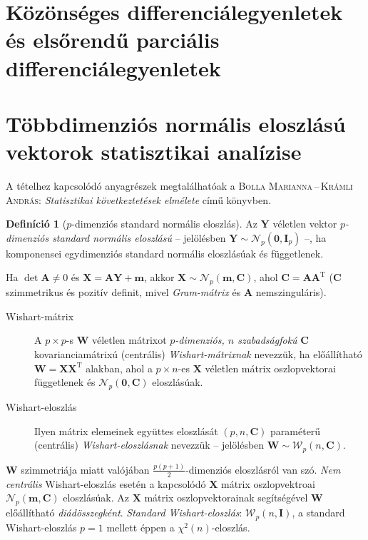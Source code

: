 \documentclass[DIV=15,appendixprefix]{scrreprt}
\theoremstyle{definition}
\newtheorem*{defin}{Definíció}
\theoremstyle{remark}
\newcommand{\normald}{\mathcal{N}}
\newcommand{\wishartd}{\mathcal{W}}
\DeclareMathOperator{\T}{T}
\begin{document}
\section{Közönséges differenciálegyenletek és elsőrendű parciális differenciálegyenletek}
%
\section{Többdimenziós normális eloszlású vektorok statisztikai analízise}
A tételhez kapcsolódó anyagrészek megtalálhatóak a \textsc{Bolla Marianna\,--\,Krámli András}:
\emph{Statisztikai következtetések elmélete} \cite{BollaKramli} című könyvben.

\begin{defin}[$ p $-dimenziós standard normális eloszlás] Az $ \mathbf{ Y } $ véletlen vektor
	\emph{$ p $-dimenziós standard normális eloszlású} -- jelölésben $ \mathbf{ Y } \sim
	\normald_{ p } \left( \mathbf{ 0 },{} \mathbf{ I }_{ p } \right) $ --, ha komponensei
	egydimenziós standard normális eloszlásúak és függetlenek.
\end{defin}
Ha $ \det \mathbf{ A } \neq 0 $ és $ \mathbf{ X } = \mathbf{ A } \mathbf{ Y } + \mathbf{ m } $,
akkor $ \mathbf{ X } \sim \normald_{ p } \left( \mathbf{ m },{} \mathbf{ C } \right) $, ahol
$ \mathbf{ C } = \mathbf{ A } \mathbf{ A }^{ \T } $ ($ \mathbf{ C } $ szimmetrikus és pozitív
definit, mivel \emph{Gram-mátrix} és $ \mathbf{ A } $ nemszinguláris).
%
\leavevmode
\begin{description}
	\item[Wishart-mátrix] A $ p \times  p $-s $ \mathbf{ W } $ véletlen mátrixot
		\emph{$ p $-dimenziós, $ n $ szabadságfokú} $ \mathbf{ C } $ kovarianciamátrixú (centrális)
		\emph{Wishart-mátrixnak} nevezzük, ha előállítható $ \mathbf{ W } = \mathbf{ X }
		\mathbf{ X }^{ \T } $ alakban, ahol a $ p \times n $-es $ \mathbf{ X } $ véletlen mátrix
		oszlopvektorai függetlenek és $ \normald_{ p } \left( \mathbf{ 0 },{} \mathbf{ C } \right) $
		eloszlásúak.
	\item[Wishart-eloszlás] Ilyen mátrix elemeinek együttes eloszlását $ \left( p,{} n,{}
		\mathbf{ C } \right) $ paraméterű (centrális) \emph{Wi\-shart-eloszlásnak} nevezzük --
		jelölésben $ \mathbf{ W } \sim \wishartd_{ p } \left( n,{} \mathbf{ C } \right) $.
\end{description}
$ \mathbf{ W } $ szimmetriája miatt valójában $ \frac{ p
\left( p + 1 \right) }{ 2 } $-dimenziós eloszlásról van szó. \emph{Nem centrális} Wishart-eloszlás
esetén a kapcsolódó $ \mathbf{ X } $ mátrix oszlopvektroai $ \normald_{ p } \left( \mathbf{ m },{}
\mathbf{ C } \right) $ eloszlásúak. Az $ \mathbf{ X } $ mátrix oszlopvektorainak segítségével
$ \mathbf{ W } $ előállítható \emph{diádösszegként}. \emph{Standard Wishart-eloszlás}:
$ \wishartd_{ p } \left( n,{} \mathbf{ I } \right) $, a standard Wishart-eloszlás $ p  = 1 $ mellett
éppen a $ \chi^{ 2 } \left( n \right) $-eloszlás.
\end{document}
